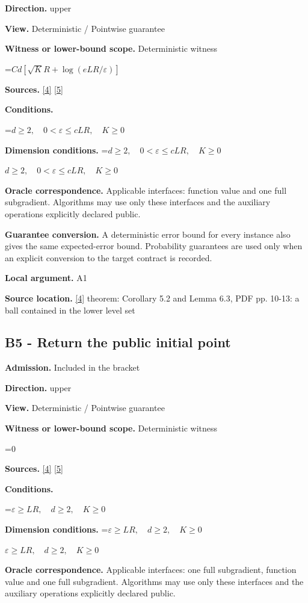 \documentclass[10pt,a4paper]{article}
\newcommand{\AtlasMath}[1]{\par\begingroup\centering\setbox0=\hbox{$\displaystyle #1$}\ifdim\wd0>1.4\linewidth\typeout{ATLAS WIDE FORMULA: \the\wd0}\fi\ifdim\wd0>\linewidth\resizebox{\linewidth}{!}{\box0}\else\box0\fi\par\endgroup}
\newcommand{\AtlasInlineMath}[1]{\begingroup\setbox0=\hbox{$#1$}\ifdim\wd0>.4\linewidth\endgroup\AtlasMath{#1}\else\endgroup$#1$\fi}
\begin{document}
\textbf{Direction.} upper

\textbf{View.} Deterministic / Pointwise guarantee

\textbf{Witness or lower-bound scope.} Deterministic witness

\AtlasMath{C d[\sqrt K R+\log(eLR/\varepsilon)]}
\textbf{Sources.} \href{https://arxiv.org/pdf/2605.17540v4}{[4]} \href{https://arxiv.org/pdf/1405.4980}{[5]}

\textbf{Conditions.} 
\AtlasMath{d\ge2,\quad0<\varepsilon\le cLR,\quad K\ge0}


\textbf{Dimension conditions.} \AtlasInlineMath{d\ge2,\quad0<\varepsilon\le cLR,\quad K\ge0}

\textbf{Oracle correspondence.} Applicable interfaces: function value and one full subgradient. Algorithms may use only these interfaces and the auxiliary operations explicitly declared public.

\textbf{Guarantee conversion.} A deterministic error bound for every instance also gives the same expected-error bound. Probability guarantees are used only when an explicit conversion to the target contract is recorded.

\textbf{Local argument.} A1

\textbf{Source location.} \href{https://arxiv.org/pdf/2605.17540v4}{[4]} theorem: Corollary 5.2 and Lemma 6.3, PDF pp. 10-13: a ball contained in the lower level set

\subsection{B5 - Return the public initial point}
\textbf{Admission.} Included in the bracket

\textbf{Direction.} upper

\textbf{View.} Deterministic / Pointwise guarantee

\textbf{Witness or lower-bound scope.} Deterministic witness

\AtlasMath{0}
\textbf{Sources.} \href{https://arxiv.org/pdf/2605.17540v4}{[4]} \href{https://arxiv.org/pdf/1405.4980}{[5]}

\textbf{Conditions.} 
\AtlasMath{\varepsilon\ge LR,\quad d\ge2,\quad K\ge0}


\textbf{Dimension conditions.} \AtlasInlineMath{\varepsilon\ge LR,\quad d\ge2,\quad K\ge0}

\textbf{Oracle correspondence.} Applicable interfaces: one full subgradient, function value and one full subgradient. Algorithms may use only these interfaces and the auxiliary operations explicitly declared public.
\end{document}
